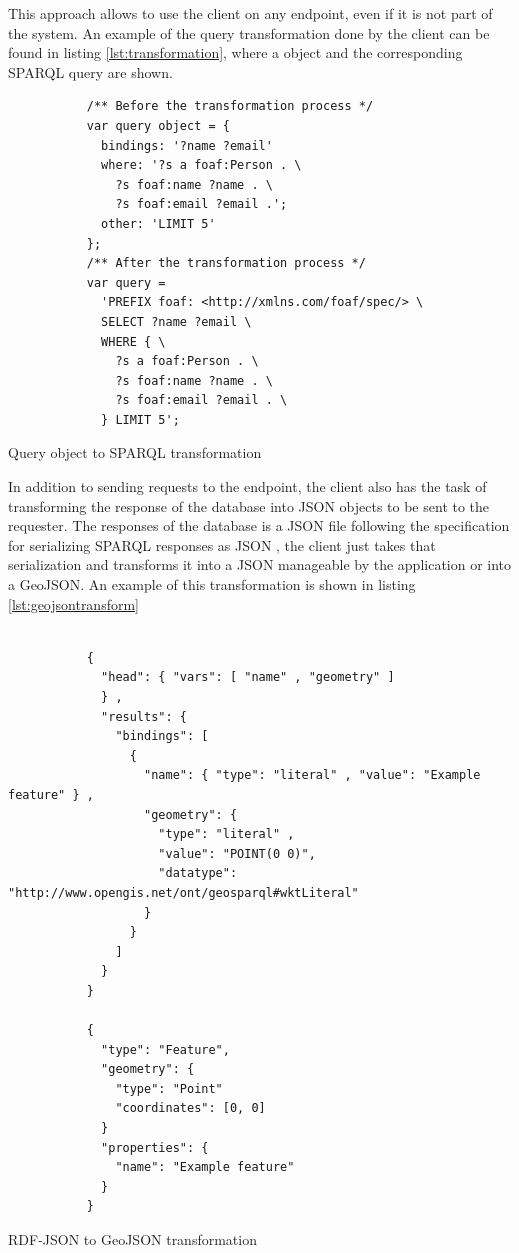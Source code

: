 This approach allows to use the client on any endpoint, even if it is not part of the system. An example of the query transformation done by the client can be found in listing \ref{lst:transformation}, where a object and the corresponding SPARQL query are shown.

\begin{listing}[ht]\centering
  \begin{minipage}{.6\textwidth}
    \begin{verbatim}
	       /** Before the transformation process */
	       var query object = {
	         bindings: '?name ?email'
	         where: '?s a foaf:Person . \
	           ?s foaf:name ?name . \
	           ?s foaf:email ?email .';
	         other: 'LIMIT 5' 
	       };
	       /** After the transformation process */
	       var query =
	         'PREFIX foaf: <http://xmlns.com/foaf/spec/> \
	         SELECT ?name ?email \
	         WHERE { \
	           ?s a foaf:Person . \
	           ?s foaf:name ?name . \
	           ?s foaf:email ?email . \
	         } LIMIT 5';
    \end{verbatim}
  \end{minipage}
  \caption{Query object to SPARQL transformation}\label{lst:transformation}
\end{listing}

In addition to sending requests to the endpoint, the client also has the task of transforming the response of the database into JSON objects to be sent to the requester. The responses of the database is a JSON file following the specification for serializing SPARQL responses as JSON \cite{sparql-json}, the client just takes that serialization and transforms it into a JSON manageable by the application or into a GeoJSON. An example of this transformation is shown in listing \ref{lst:geojsontransform}

\begin{listing}[ht]\centering
  \begin{minipage}{.85\textwidth}
    \begin{verbatim}
 
	       {
	         "head": { "vars": [ "name" , "geometry" ]
	         } ,
	         "results": { 
	           "bindings": [
	             {
	               "name": { "type": "literal" , "value": "Example feature" } ,
	               "geometry": { 
	                 "type": "literal" , 
	                 "value": "POINT(0 0)", 
	                 "datatype": "http://www.opengis.net/ont/geosparql#wktLiteral" 
	               }
	             } 
	           ]
	         }
	       }

	       {
	         "type": "Feature",
	         "geometry": {
	           "type": "Point"
	           "coordinates": [0, 0]
	         }
	         "properties": {
	           "name": "Example feature"
	         }
	       }
    \end{verbatim}
  \end{minipage}
  \caption{RDF-JSON to GeoJSON transformation}\label{lst:geojsontransform}
\end{listing}

